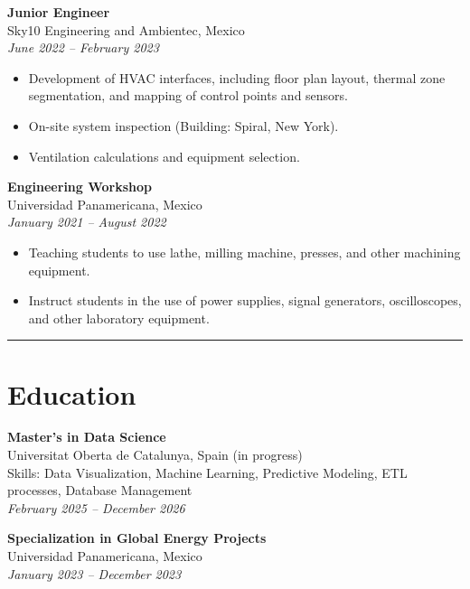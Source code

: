 \documentclass[11pt,a4paper]{article}
\begin{document}
\begin{minipage}[t]{0.65\textwidth}
\vspace{1em}

\textbf{Junior Engineer} \\
Sky10 Engineering and Ambientec, Mexico \\
\textit{June 2022 -- February 2023}
\begin{itemize}
    \item Development of HVAC interfaces, including floor plan layout, thermal zone segmentation, and mapping of control points and sensors.
    \item On-site system inspection (Building: Spiral, New York).
    \item Ventilation calculations and equipment selection.
\end{itemize}

\vspace{1em}

\textbf{Engineering Workshop} \\
Universidad Panamericana, Mexico \\
\textit{January 2021 -- August 2022}
\begin{itemize}
    \item Teaching students to use lathe, milling machine, presses, and other machining equipment.
    \item Instruct students in the use of power supplies, signal generators, oscilloscopes, and other laboratory equipment.
\end{itemize}

\vspace*{1 em}
{\color{lightgray}\hrule}

\section*{Education}
\footnotesize

\textbf{Master's in Data Science} \\
Universitat Oberta de Catalunya, Spain (in progress) \\
Skills: Data Visualization, Machine Learning, Predictive Modeling, ETL processes, Database Management\\
\textit{February 2025 -- December 2026}

\vspace{.7em}

\textbf{Specialization in Global Energy Projects} \\
Universidad Panamericana, Mexico \\
\textit{January 2023 -- December 2023}


\end{minipage}
\end{document}
